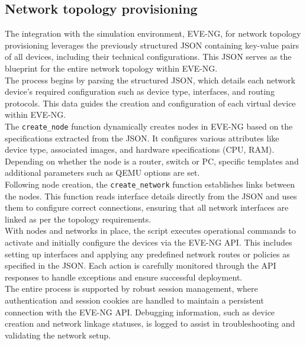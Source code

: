 \subsection{Network topology provisioning}
The integration with the simulation environment, EVE-NG, for network topology provisioning leverages the previously structured JSON containing key-value pairs of all devices, including their technical configurations. This JSON serves as the blueprint for the entire network topology within EVE-NG.\\ 
The process begins by parsing the structured JSON, which details each network device's required configuration such as device type, interfaces, and routing protocols. This data guides the creation and configuration of each virtual device within EVE-NG.\\
The \verb|create_node| function dynamically creates nodes in EVE-NG based on the specifications extracted from the JSON. It configures various attributes like device type, associated images, and hardware specifications (CPU, RAM). Depending on whether the node is a router, switch or PC, specific templates and additional parameters such as QEMU options are set. \\
Following node creation, the \verb|create_network| function establishes links between the nodes. This function reads interface details directly from the JSON and uses them to configure correct connections, ensuring that all network interfaces are linked as per the topology requirements.\\ 
With nodes and networks in place, the script executes operational commands to activate and initially configure the devices via the EVE-NG API. This includes setting up interfaces and applying any predefined network routes or policies as specified in the JSON. Each action is carefully monitored through the API responses to handle exceptions and ensure successful deployment.\\
The entire process is supported by robust session management, where authentication and session cookies are handled to maintain a persistent connection with the EVE-NG API. Debugging information, such as device creation and network linkage statuses, is logged to assist in troubleshooting and validating the network setup.






